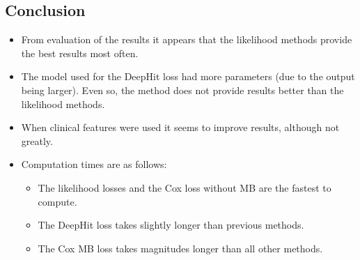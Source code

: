 \documentclass[landscape, color=UCLburgundy, margin=1cm]{uclposter}
\begin{document}
\begin{multicols}{2}
\begin{multicols}{2}
            \section*{Conclusion}
                \begin{highlightbox}[UCLlightgreen]
                    \begin{itemize}
                        \item From evaluation of the results it appears that the likelihood methods provide the best results most often.
                        
                        \item The model used for the DeepHit loss had more parameters (due to the output being larger). Even so, the method does not provide results better than the likelihood methods.
                        
                        \item When clinical features were used it seems to improve results, although not greatly.
    
                        \item Computation times are as follows:
    
                        \begin{itemize}
                            \item The likelihood losses and the Cox loss without \gls{MB} are the fastest to compute.
                            
                            \item The DeepHit loss takes slightly longer than previous methods.
                            
                            \item The Cox \gls{MB} loss takes magnitudes longer than all other methods.
                        \end{itemize}
                    \end{itemize}
                \end{highlightbox}
        \end{multicols}
    \end{multicols}
\end{document}
